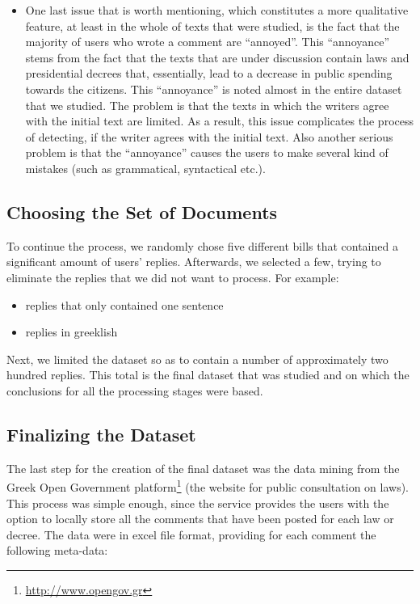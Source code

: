 \begin{itemize}
  \item One last issue that is worth mentioning, which constitutes a more qualitative feature, at least in the whole of texts that were studied, is the fact that the majority of users who wrote a comment are ``annoyed''. This ``annoyance'' stems from the fact that the texts that are under discussion contain laws and presidential decrees that, essentially, lead to a decrease in public spending towards the citizens. This ``annoyance'' is noted almost in the entire dataset that we studied. The problem is that the texts in which the writers agree with the initial text are limited. As a result, this issue complicates the process of detecting, if the writer agrees with the initial text. Also another serious problem is that the ``annoyance'' causes the users to make several kind of mistakes (such as grammatical, syntactical etc.).
\end{itemize}


\subsection{Choosing the Set of Documents}\label{312_ref}
To continue the process, we randomly chose five different bills that contained a significant amount of users' replies. Afterwards, we selected a few, trying to eliminate the replies that we did not want to process. For example:\\

\begin{itemize}

	\item replies that only contained one sentence
	\item replies in greeklish\\

\end{itemize}

Next, we limited the dataset so as to contain a number of approximately two hundred replies. This total is the final dataset that was studied and on which the conclusions for all the processing stages were based.

\subsection{Finalizing the Dataset}\label{313_ref}
The last step for the creation of the final dataset was the data mining from the Greek Open Government platform\footnote{\url{http://www.opengov.gr}} (the website for public consultation on laws). This process was  simple enough, since the service provides the users with the option to locally store all the comments that have been posted for each law or decree. The data were in excel file format, providing for each comment the following meta-data:\\

